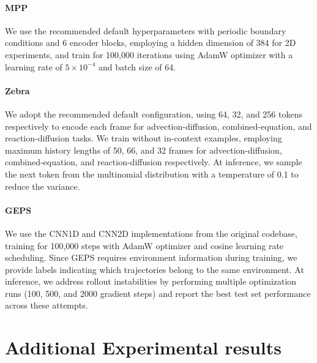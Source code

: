 \documentclass{article}
\theoremstyle{plain}
\theoremstyle{definition}
\theoremstyle{remark}
\begin{document}
\paragraph{MPP} We use the recommended default hyperparameters with periodic boundary conditions and 6 encoder blocks, employing a hidden dimension of 384 for 2D experiments, and train for 100,000 iterations using AdamW optimizer with a learning rate of $5 \times 10^{-4}$ and batch size of 64.

\paragraph{Zebra} We adopt the recommended default configuration, using 64, 32, and 256 tokens respectively to encode each frame for advection-diffusion, combined-equation, and reaction-diffusion tasks. We train without in-context examples, employing maximum history lengths of 50, 66, and 32 frames for advection-diffusion, combined-equation, and reaction-diffusion respectively. At inference, we sample the next token from the multinomial distribution with a temperature of 0.1 to reduce the variance.

\paragraph{GEPS} We use the CNN1D and CNN2D implementations from the original codebase, training for 100,000 steps with AdamW optimizer and cosine learning rate scheduling. Since GEPS requires environment information during training, we provide labels indicating which trajectories belong to the same environment. At inference, we address rollout instabilities by performing multiple optimization runs (100, 500, and 2000 gradient steps) and report the best test set performance across these attempts.

\section{Additional Experimental results}



\end{document}
